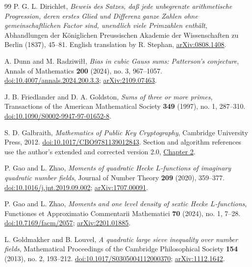\begin{thebibliography}{99}
P. G. L. Dirichlet,
\emph{Beweis des Satzes, da\ss{} jede unbegrenzte arithmetische
Progression, deren erstes Glied und Differenz ganze Zahlen ohne
gemeinschaftlichen Factor sind, unendlich viele Primzahlen enth\"alt},
Abhandlungen der K\"oniglichen Preussischen Akademie der Wissenschaften
zu Berlin (1837), 45--81.
English translation by R. Stephan,
\href{https://arxiv.org/abs/0808.1408}{arXiv:0808.1408}.

A. Dunn and M. Radziwi\l\l,
\emph{Bias in cubic Gauss sums: Patterson's conjecture},
Annals of Mathematics \textbf{200} (2024), no. 3, 967--1057.
\href{https://doi.org/10.4007/annals.2024.200.3.3}{doi:10.4007/annals.2024.200.3.3};
\href{https://arxiv.org/abs/2109.07463}{arXiv:2109.07463}.

J. B. Friedlander and D. A. Goldston,
\emph{Sums of three or more primes},
Transactions of the American Mathematical Society \textbf{349} (1997),
no. 1, 287--310.
\href{https://doi.org/10.1090/S0002-9947-97-01652-8}{doi:10.1090/S0002-9947-97-01652-8}.

S. D. Galbraith,
\emph{Mathematics of Public Key Cryptography},
Cambridge University Press, 2012.
\href{https://doi.org/10.1017/CBO9781139012843}{doi:10.1017/CBO9781139012843}.
Section and algorithm references use the author's extended and corrected
version 2.0, \href{https://www.math.auckland.ac.nz/~sgal018/crypto-book/ch2.pdf}{Chapter 2}.

P. Gao and L. Zhao,
\emph{Moments of quadratic Hecke $L$-functions of imaginary quadratic
number fields},
Journal of Number Theory \textbf{209} (2020), 359--377.
\href{https://doi.org/10.1016/j.jnt.2019.09.002}{doi:10.1016/j.jnt.2019.09.002};
\href{https://arxiv.org/abs/1707.00091}{arXiv:1707.00091}.

P. Gao and L. Zhao,
\emph{Moments and one level density of sextic Hecke $L$-functions},
Functiones et Approximatio Commentarii Mathematici \textbf{70} (2024),
no. 1, 7--28.
\href{https://doi.org/10.7169/facm/2057}{doi:10.7169/facm/2057};
\href{https://arxiv.org/abs/2201.01885}{arXiv:2201.01885}.

L. Goldmakher and B. Louvel,
\emph{A quadratic large sieve inequality over number fields},
Mathematical Proceedings of the Cambridge Philosophical Society
\textbf{154} (2013), no. 2, 193--212.
\href{https://doi.org/10.1017/S0305004112000370}{doi:10.1017/S0305004112000370};
\href{https://arxiv.org/abs/1112.1642}{arXiv:1112.1642}.


\end{thebibliography}

